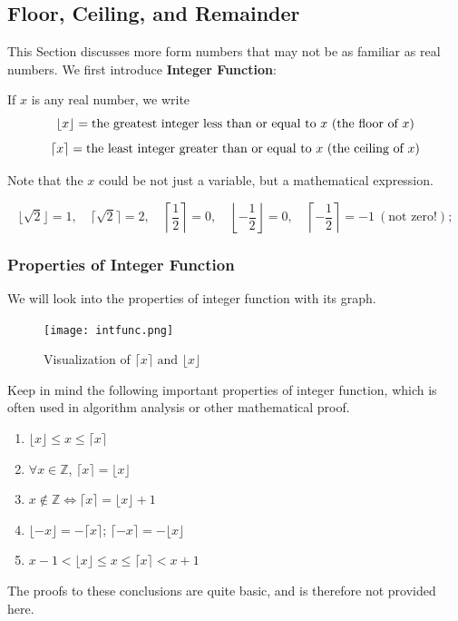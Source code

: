 \subsection{Floor, Ceiling, and Remainder}
This Section discusses more form numbers that may not be as familiar as real numbers. We first introduce 
\textbf{Integer Function}:
\begin{definition}
    If \( x \) is any real number, we write
\[
\lfloor x \rfloor = \text{the greatest integer less than or equal to \( x \) (the floor of \( x \))}
\]
\[
\lceil x \rceil = \text{the least integer greater than or equal to \( x \) (the ceiling of \( x \))}
\]
\end{definition}
Note that the $x$ could be not just a variable, but a mathematical expression.
\begin{example}
    \[
\lfloor \sqrt{2} \rfloor = 1, \quad \lceil \sqrt{2} \rceil = 2, \quad \left\lceil \frac{1}{2} \right\rceil = 0, \quad \left\lfloor -\frac{1}{2} \right\rfloor = 0, \quad \left\lceil -\frac{1}{2} \right\rceil = -1 \ (\text{not zero!});
\]
\end{example}

\subsubsection{Properties of Integer Function}
We will look into the properties of integer function with its graph. 
    \begin{figure}[H]
        \centering
        \texttt{[image: intfunc.png]}
        \caption{Visualization of $\lceil x \rceil \text{ and } \lfloor x \rfloor$}
    \end{figure}

\begin{theorem}
    Keep in mind the following important properties of integer function, which is 
    often used in algorithm analysis or other mathematical proof.
    \begin{enumerate}
        \item $\lfloor x \rfloor \leq x \leq \lceil x \rceil$
        \item  $\forall x\in \mathbb{Z} \text{, } \lceil x \rceil = \lfloor x \rfloor$
        \item $x \notin \mathbb{Z} \iff  \lceil x \rceil =  \lfloor x \rfloor+ 1  $
        \item $\lfloor -x \rfloor = -\lceil x \rceil $; $\lceil-x \rceil = - \lfloor x \rfloor$
        \item $x - 1 < \lfloor x \rfloor \leq x \leq \lceil x \rceil < x + 1$
    \end{enumerate}
\end{theorem}
The proofs to these conclusions are quite basic, and is therefore not provided here.

